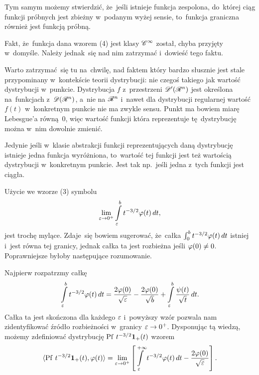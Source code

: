 \documentclass[a4paper,11pt]{article}
\begin{document}
Tym samym możemy stwierdzić, że~jeśli istnieje funkcja zespolona,
do~której ciąg funkcji próbnych jest zbieżny w~podanym wyżej sensie,
to~funkcja graniczna również jest funkcją próbną.

\start {} Fakt, że~funkcja dana wzorem (4) jest klasy $\mathcal{C}^{ \infty }$
został, chyba przyjęty w~domyśle. Należy jednak~się nad nim zatrzymać
i~dowieść tego faktu. \Dok

\start {} Warto zatrzymać~się tu na~chwilę, nad faktem który
bardzo słusznie jest stale przypominany w~kontekście teorii
dystrybucji: nie czegoś takiego jak wartość dystrybucji w~punkcie.
Dystrybucja $f$ z~przestrzeni $\mathcal{D}'( \mathcal{R}^{ n } )$ jest określona
na~funkcjach z~$\mathcal{D}( \mathcal{R}^{ n } )$, a~nie na $\mathcal{R}^{ n }$ i~nawet dla dystrybucji
regularnej wartość $f( t )$ w~konkretnym punkcie nie ma zwykle sensu.
Punkt ma bowiem miarę Lebesgue'a równą~0, więc wartość funkcji która
reprezentuje tę~dystrybucję można w~nim dowolnie zmienić.

Jedynie jeśli w~klasie abstrakcji funkcji reprezentujących daną
dystrybucję istnieje jedna funkcja wyróżniona, to~wartość tej funkcji
jest też wartością dystrybucji w~konkretnym punkcie. Jest tak
np.~jeśli jedna z~tych funkcji jest ciągła.

\start {} Użycie we wzorze (3) symbolu
\begin{equation}
  \label{eq:Zem-s01-01}
  \lim\limits_{ \varepsilon \to 0^{ + } } \int\limits_{ \varepsilon }^{ b } t^{ -3/2 } \varphi( t ) \, dt,
\end{equation}
jest trochę mylące. Zdaje~się bowiem sugerować, że~całka
$\int_{ 0 }^{ b } t^{ -3/2 } \varphi( t ) \, dt$ istniej i~jest równa tej
granicy, jednak całka ta jest rozbieżna jeśli $\varphi( 0 ) \neq 0$.
Poprawniejsze byłoby następujące
rozumowanie. %

Najpierw rozpatrzmy całkę
\begin{equation}
  \label{eq:Zem-s01-02}
  \int\limits_{ \varepsilon }^{ b } t^{ -3/2 } \varphi( t ) \, dt
  = \frac{ 2 \varphi( 0 ) }{ \sqrt{ \varepsilon } } - \frac{ 2 \varphi( 0 ) }{ \sqrt{ b } }
  + \int\limits_{ \varepsilon }^{ b } \frac{ \psi( t ) }{ \sqrt{ t } } \, dt.
\end{equation}
Całka ta jest skończona dla każdego $\varepsilon$ i~powyższy wzór pozwala
nam zidentyfikować źródło rozbieżności w~granicy $\varepsilon \to 0^{ + }$.
Dysponując tą wiedzą, możemy zdefiniować dystrybucję
$\mathrm{Pf}\, \, t^{ -3/2 } \mathbf{1}_{ + }( t )$ wzorem
\begin{equation}
  \label{eq:Zem-s01-03}
  \langle \mathrm{Pf}\, \, t^{ -3/2 } \mathbf{1}_{ + }( t ), \varphi( t ) \rangle = \lim\limits_{ \varepsilon \to 0^{ + } }
  \left[ \int\limits_{ \varepsilon }^{ +\infty } t^{ -3/2 } \varphi( t ) \, dt
    - \frac{ 2 \varphi( 0 ) }{ \sqrt{ \varepsilon } } \right].
\end{equation}
\end{document}
